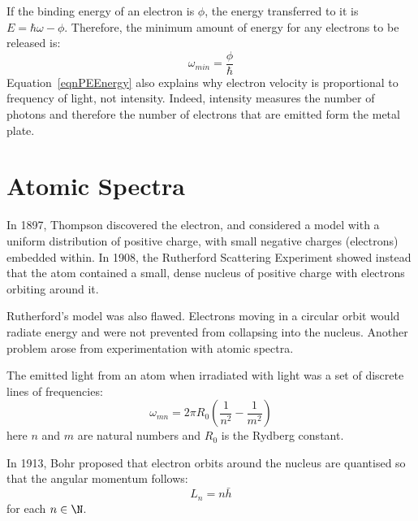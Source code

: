\documentclass[../Main.tex]{subfiles}
\begin{document}
If the binding energy of an electron is $\phi$, the energy transferred to it is $E = \hbar \omega - \phi$. Therefore, the minimum amount of energy for any electrons to be released is:
\begin{equation}
    \omega_{min} = \frac{\phi}{\hbar}
    \label{eqnPEEnergy}
\end{equation}
Equation~\ref{eqnPEEnergy} also explains why electron velocity is proportional to frequency of light, not intensity. Indeed, intensity measures the number of photons and therefore the number of electrons that are emitted form the metal plate.
\section{Atomic Spectra}
In 1897, Thompson discovered the electron, and considered a model with a uniform distribution of positive charge, with small negative charges (electrons) embedded within. In 1908, the Rutherford Scattering Experiment showed instead that the atom contained a small, dense nucleus of positive charge with electrons orbiting around it.

Rutherford's model was also flawed. Electrons moving in a circular orbit would radiate energy and were not prevented from collapsing into the nucleus. Another problem arose from experimentation with atomic spectra.

The emitted light from an atom when irradiated with light was a set of discrete lines of frequencies:
\begin{equation}
    \omega_{mn} = 2\pi R_0 \left(\frac{1}{n^2} - \frac1{m^2}\right)
    \label{eqnAtomSpectra}
\end{equation}
here $n$ and $m$ are natural numbers and $R_0$ is the Rydberg constant.

In 1913, Bohr proposed that electron orbits around the nucleus are quantised so that the angular momentum follows: \begin{equation}
    L_n = n \bar{h}
    \label{eqnQuantisedL}
\end{equation}
for each $n \in \N$.
\end{document}
